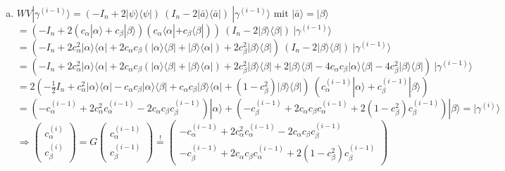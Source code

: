 \documentclass[a4paper]{scrartcl}
\begin{document}
\begin{enumerate}[a)]
\item $WV | \gamma^{(i-1)} \rangle = (-I_n +2 |\psi \rangle \langle \psi | ) ~ (I_n - 2 |\bar{a} \rangle \langle \bar{a}| ) ~ | \gamma^{(i-1)} \rangle$ mit $|\bar{a} \rangle = |\beta \rangle$\\
$= (-I_n +2 (c_{\alpha} |\alpha \rangle + c_{\beta} |\beta \rangle) (c_{\alpha} \langle \alpha| + c_{\beta} \langle \beta|) ) ~ (I_n - 2 | \beta \rangle \langle \beta| ) ~ | \gamma^{(i-1)} \rangle$\\
$= (-I_n +2 c_{\alpha}^2 |\alpha \rangle \langle \alpha| + 2 c_{\alpha} c_{\beta} ( |\alpha \rangle \langle \beta| + |\beta \rangle \langle \alpha|) + 2 c_{\beta}^2 |\beta \rangle \langle \beta| ) ~ (I_n - 2 | \beta \rangle \langle \beta| ) ~ | \gamma^{(i-1)} \rangle$\\
$= (-I_n +2 c_{\alpha}^2 |\alpha \rangle \langle \alpha| + 2c_{\alpha}c_{\beta} ( |\alpha \rangle \langle \beta| + |\beta \rangle \langle \alpha|) + 2c_{\beta}^2 |\beta \rangle \langle \beta| + 2 | \beta \rangle \langle \beta| - 4 c_{\alpha}c_{\beta} |\alpha \rangle \langle \beta| - 4 c_{\beta}^2 |\beta \rangle \langle \beta| ) ~ | \gamma^{(i-1)} \rangle$\\
$= 2(- \frac{1}{2}I_n + c_{\alpha}^2 |\alpha \rangle \langle \alpha| - c_{\alpha}c_{\beta} |\alpha \rangle \langle \beta| + c_{\alpha}c_{\beta} |\beta \rangle \langle \alpha| + (1 - c_{\beta}^2) |\beta \rangle \langle \beta|) ~ (c_{\alpha}^{(i-1)} |\alpha \rangle + c_{\beta}^{(i-1)} |\beta \rangle)$\\
$= (-c_{\alpha}^{(i-1)} + 2c_{\alpha}^2 c_{\alpha}^{(i-1)} - 2c_{\alpha}c_{\beta} c_{\beta}^{(i-1)}) |\alpha \rangle + (-c_{\beta}^{(i-1)} + 2c_{\alpha}c_{\beta} c_{\alpha}^{(i-1)} + 2(1 - c_{\beta}^2) c_{\beta}^{(i-1)} ) |\beta \rangle = | \gamma^{(i)} \rangle$\\

$\Rightarrow  \begin{pmatrix} c_{\alpha}^{(i)}\\ c_{\beta}^{(i)}\end{pmatrix} = G \begin{pmatrix} c_{\alpha}^{(i-1)}\\ c_{\beta}^{(i-1)}\end{pmatrix} \stackrel{!}{=} \begin{pmatrix}-c_{\alpha}^{(i-1)} + 2c_{\alpha}^2 c_{\alpha}^{(i-1)} - 2c_{\alpha}c_{\beta} c_{\beta}^{(i-1)} \\ -c_{\beta}^{(i-1)} + 2c_{\alpha}c_{\beta} c_{\alpha}^{(i-1)} + 2(1 - c_{\beta}^2) c_{\beta}^{(i-1)} \end{pmatrix}$\\


\end{enumerate}
\end{document}
